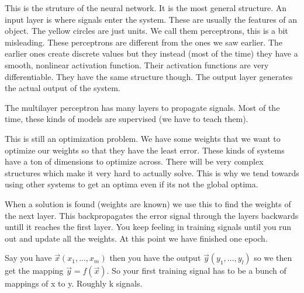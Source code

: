 \documentclass{article}
\begin{document}

This is the struture of the neural network. It is the most general structure. An input layer is where signals enter the system. These are usually the features of an object. The yellow circles are just units. We call them perceptrons, this is a bit misleading. These perceptrons are different from the ones we saw earlier. The earlier ones create discrete values but they instead (most of the time) they have a smooth, nonlinear activation function. Their activation functions are very differentiable. They have the same structure though. The output layer generates the actual output of the system.


The multilayer perceptron has many layers to propagate signals. Most of the time, these kinds of models are supervised (we have to teach them).

This is still an optimization problem. We have some weights that we want to optimize our weights so that they have the least error. These kinds of systems have a ton of dimensions to optimize across. There will be very complex structures which make it very hard to actually solve. This is why we tend towards using other systems to get an optima even if its not the global optima.

When a solution is found (weights are known) we use this to find the weights of the next layer. This backpropagates the error signal through the layers backwards untill it reaches the first layer. You keep feeling in training signals until you run out and update all the weights. At this point we have finished one epoch.

Say you have $\overrightarrow{x}(x_1, ..., x_m)$ then you have the output $\overrightarrow{y}(y_1, ..., y_l)$ so we then get the mapping $\overrightarrow{y} = f(\overrightarrow{x})$. So your first training signal has to be a bunch of mappings of x to y. Roughly k signals.
\end{document}
